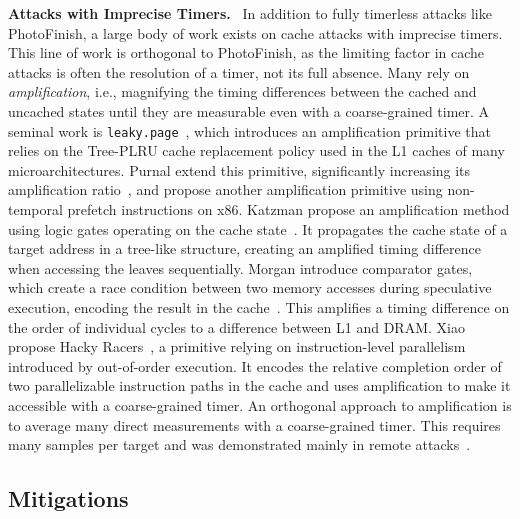 \documentclass[letterpaper,twocolumn,10pt]{article} %
\newcommand{\paragrabf}[1]{\noindent \textbf{#1.}\ }
\newcommand{\AttackName}{PhotoFinish\xspace}
\begin{document}
\paragrabf{Attacks with Imprecise Timers}
In addition to fully timerless attacks like \AttackName, a large body of work exists on cache attacks with imprecise timers.
This line of work is orthogonal to \AttackName, as the limiting factor in cache attacks is often the resolution of a timer, not its full absence.
Many rely on \emph{amplification}, i.e., magnifying the timing differences between the cached and uncached states until they are measurable even with a coarse-grained timer.
A seminal work is \texttt{leaky.page}~\cite{Roettger2021SpectreJS}, which introduces an amplification primitive that relies on the Tree-PLRU cache replacement policy used in the L1 caches of many microarchitectures.
Purnal \etal extend this primitive, significantly increasing its amplification ratio~\cite{Purnal2023showtime}, and propose another amplification primitive using non-temporal prefetch instructions on x86.
Katzman \etal propose an amplification method using logic gates operating on the cache state~\cite{Katzman2023gates}.
It propagates the cache state of a target address in a tree-like structure, creating an amplified timing difference when accessing the leaves sequentially.
Morgan \etal introduce comparator gates, which create a race condition between two memory accesses during speculative execution, encoding the result in the cache~\cite{Morgan2025slice}.
This amplifies a timing difference on the order of individual cycles to a difference between L1 and DRAM\@.
Xiao \etal propose Hacky Racers~\cite{xiao2023hacky}, a primitive relying on instruction-level parallelism introduced by out-of-order execution.
It encodes the relative completion order of two parallelizable instruction paths in the cache and uses amplification to make it accessible with a coarse-grained timer.
An orthogonal approach to amplification is to average many direct measurements with a coarse-grained timer.
This requires many samples per target and was demonstrated mainly in remote attacks~\cite{Bernstein2005,Schwarz2019netspectre,Schwarzl2021dynamic}.

\subsection{Mitigations}\label{subsec:mitigations}
\end{document}
